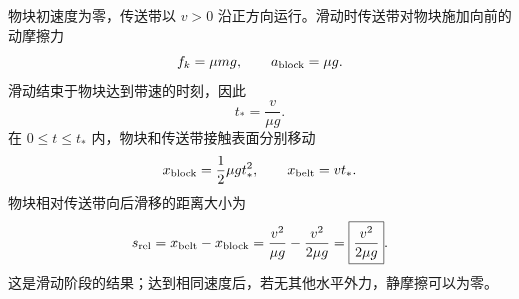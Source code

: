 物块初速度为零，传送带以 $v>0$ 沿正方向运行。滑动时传送带对物块施加向前的动摩擦力
\[
f_k=\mu mg,\qquad a_{\rm block}=\mu g.
\]
滑动结束于物块达到带速的时刻，因此
\[
\boxed{t_*=\frac{v}{\mu g}}.
\]
在 $0\leq t\leq t_*$ 内，物块和传送带接触表面分别移动
\[
x_{\rm block}=\frac12\mu gt_*^2,\qquad
x_{\rm belt}=vt_*.
\]
物块相对传送带向后滑移的距离大小为
\[
s_{\rm rel}=x_{\rm belt}-x_{\rm block}
=\frac{v^2}{\mu g}-\frac{v^2}{2\mu g}
=\boxed{\frac{v^2}{2\mu g}}.
\]
这是滑动阶段的结果；达到相同速度后，若无其他水平外力，静摩擦可以为零。

